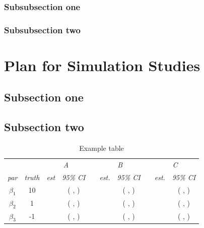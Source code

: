 \documentclass[12pt]{article}
\begin{document}
\subsubsection{Subsubsection one}\label{sec:subsub2-1}



\subsubsection{Subsubsection two}\label{sec:subsub2-2}


\newpage
\section{Plan for Simulation Studies}\label{sec:simulation}



\subsection{Subsection one}\label{sec:subsimulation1}


\subsection{Subsection two}\label{sec:subsimulation2}

\begin{table}[H]
\begin{center}
\caption{Example table}
\begin{tabular}{cccccccccc}
\hline
&  & \multicolumn{2}{c}{\emph{A}} && \multicolumn{2}{c}{\emph{B}} & &\multicolumn{2}{c}{\emph{C}} \\
\cline{3-4}\cline{6-7}\cline{9-10}
\emph{par}& \emph{truth}& \emph{est}    & \emph{95\% CI} & & \emph{est.}    & \emph{95\% CI}  && \emph{est.} & \emph{95\% CI}\\
\hline
$\beta_1$ & 10 &   &( , )& &  & ( , )& &  &( , )\\
$\beta_2$ & 1 & &( ,  ) & &  & ( , )& &  &( , )\\
$\beta_3$ & -1 &  &( ,  ) & &  & ( , )& & &( , )\\
\hline
\end{tabular}
\end{center}
\end{table}
\end{document}

